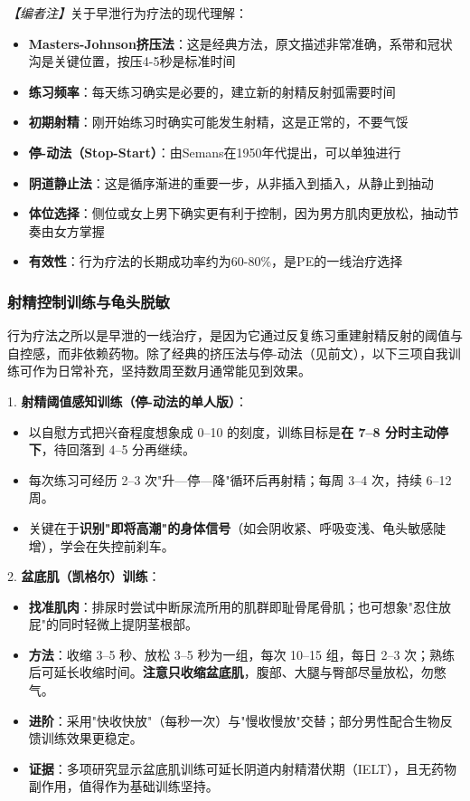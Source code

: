 \documentclass[12pt,a4paper,twoside]{ctexbook}
\begin{document}
\noindent\textit{【编者注】}关于早泄行为疗法的现代理解：
\begin{itemize}
	\item \textbf{Masters-Johnson挤压法}：这是经典方法，原文描述非常准确，系带和冠状沟是关键位置，按压4-5秒是标准时间
	\item \textbf{练习频率}：每天练习确实是必要的，建立新的射精反射弧需要时间
	\item \textbf{初期射精}：刚开始练习时确实可能发生射精，这是正常的，不要气馁
	\item \textbf{停-动法（Stop-Start）}：由Semans在1950年代提出，可以单独进行
	\item \textbf{阴道静止法}：这是循序渐进的重要一步，从非插入到插入，从静止到抽动
	\item \textbf{体位选择}：侧位或女上男下确实更有利于控制，因为男方肌肉更放松，抽动节奏由女方掌握
	\item \textbf{有效性}：行为疗法的长期成功率约为60-80\%，是PE的一线治疗选择
\end{itemize}

\subsubsection{射精控制训练与龟头脱敏}

行为疗法之所以是早泄的一线治疗，是因为它通过反复练习重建射精反射的阈值与自控感，而非依赖药物。除了经典的挤压法与停-动法（见前文），以下三项自我训练可作为日常补充，坚持数周至数月通常能见到效果。

1. \textbf{射精阈值感知训练（停-动法的单人版）}：
  \begin{itemize}
  \item 以自慰方式把兴奋程度想象成 0--10 的刻度，训练目标是\textbf{在 7--8 分时主动停下}，待回落到 4--5 分再继续。
  \item 每次练习可经历 2--3 次"升—停—降"循环后再射精；每周 3--4 次，持续 6--12 周。
  \item 关键在于\textbf{识别"即将高潮"的身体信号}（如会阴收紧、呼吸变浅、龟头敏感陡增），学会在失控前刹车。
  \end{itemize}

2. \textbf{盆底肌（凯格尔）训练}：
  \begin{itemize}
  \item \textbf{找准肌肉}：排尿时尝试中断尿流所用的肌群即耻骨尾骨肌；也可想象"忍住放屁"的同时轻微上提阴茎根部。
  \item \textbf{方法}：收缩 3--5 秒、放松 3--5 秒为一组，每次 10--15 组，每日 2--3 次；熟练后可延长收缩时间。\textbf{注意只收缩盆底肌}，腹部、大腿与臀部尽量放松，勿憋气。
  \item \textbf{进阶}：采用"快收快放"（每秒一次）与"慢收慢放"交替；部分男性配合生物反馈训练效果更稳定。
  \item \textbf{证据}：多项研究显示盆底肌训练可延长阴道内射精潜伏期（IELT），且无药物副作用，值得作为基础训练坚持。
  \end{itemize}
\end{document}
